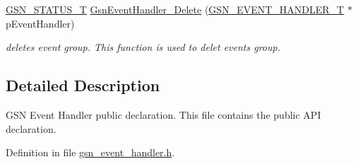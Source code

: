 \begin{DoxyCompactItemize}
\hyperlink{a00659_gae36517c0f5872426a7034c9551eb96ac}{GSN\_\-STATUS\_\-T} \hyperlink{a00622_gaae25cea2c623ec738b13c0b039151e3a}{GsnEventHandler\_\-Delete} (\hyperlink{a00069}{GSN\_\-EVENT\_\-HANDLER\_\-T} $\ast$pEventHandler)
\begin{DoxyCompactList}\small\item\em deletes event group. This function is used to delet events group. \end{DoxyCompactList}\end{DoxyCompactItemize}


\subsection{Detailed Description}
GSN Event Handler public declaration. This file contains the public API declaration. 

Definition in file \hyperlink{a00494_source}{gsn\_\-event\_\-handler.h}.

